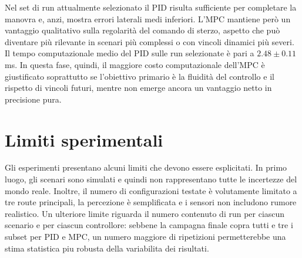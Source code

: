 Nel set di run attualmente selezionato il PID risulta sufficiente per completare la manovra e, anzi, mostra errori laterali medi inferiori. L'MPC mantiene però un vantaggio qualitativo sulla regolarità del comando di sterzo, aspetto che può diventare più rilevante in scenari più complessi o con vincoli dinamici più severi. Il tempo computazionale medio del PID sulle run selezionate è pari a $2.48 \pm 0.11$\,ms. In questa fase, quindi, il maggiore costo computazionale dell'MPC è giustificato soprattutto se l'obiettivo primario è la fluidità del controllo e il rispetto di vincoli futuri, mentre non emerge ancora un vantaggio netto in precisione pura.

\section{Limiti sperimentali}

Gli esperimenti presentano alcuni limiti che devono essere esplicitati. In primo luogo, gli scenari sono simulati e quindi non rappresentano tutte le incertezze del mondo reale. Inoltre, il numero di configurazioni testate è volutamente limitato a tre route principali, la percezione è semplificata e i sensori non includono rumore realistico. Un ulteriore limite riguarda il numero contenuto di run per ciascun scenario e per ciascun controllore: sebbene la campagna finale copra tutti e tre i subset per PID e MPC, un numero maggiore di ripetizioni permetterebbe una stima statistica piu robusta della variabilita dei risultati.
